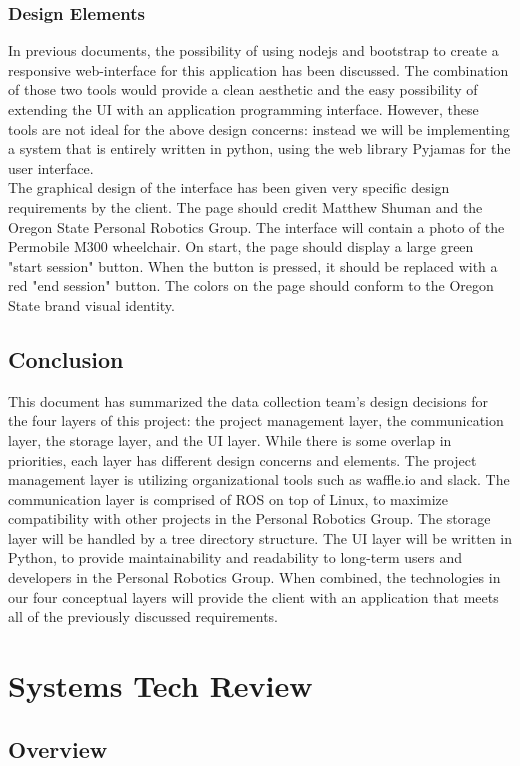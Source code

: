 \documentclass[onecolumn, draftclsnofoot,10pt, compsoc]{report}
\begin{document}
\subsection{Design Elements}
In previous documents, the possibility of using nodejs and bootstrap to create a responsive web-interface for this application has been discussed. The combination of those two tools would provide a clean aesthetic and the easy possibility of extending the UI with an application programming interface. However, these tools are not ideal for the above design concerns: instead we will be implementing a system that is entirely written in python, using the web library Pyjamas for the user interface. 
\\
The graphical design of the interface has been given very specific design requirements by the client. The page should credit Matthew Shuman and the Oregon State Personal Robotics Group. The interface will contain a photo of the Permobile M300 wheelchair. On start, the page should display a large green "start session" button. When the button is pressed, it should be replaced with a red "end session" button. The colors on the page should conform to the Oregon State brand visual identity.

\section{Conclusion}
This document has summarized the data collection team's design decisions for the four layers of this project: the project management layer, the communication layer, the storage layer, and the UI layer. While there is some overlap in priorities, each layer has different design concerns and elements. The project management layer is utilizing organizational tools such as waffle.io and slack. The communication layer is comprised of ROS on top of Linux, to maximize compatibility with other projects in the Personal Robotics Group. The storage layer will be handled by a tree directory structure. The UI layer will be written in Python, to provide maintainability and readability to long-term users and developers in the Personal Robotics Group. When combined, the technologies in our four conceptual layers will provide the client with an application that meets all of the previously discussed requirements.

\chapter{Systems Tech Review}
\minitoc
\section{Overview}
\end{document}
